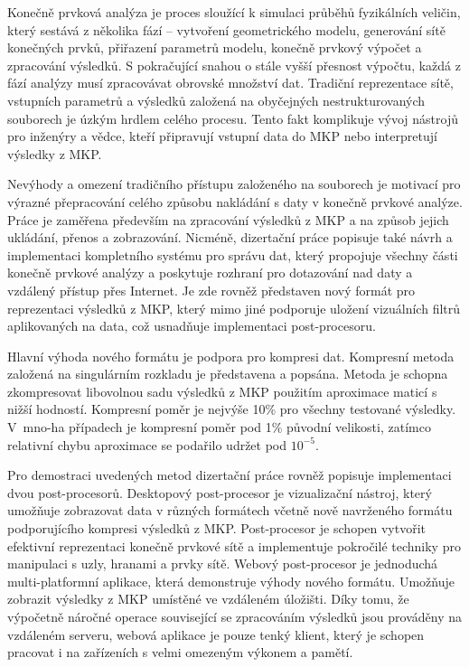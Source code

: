 \noindent
Konečně prvková analýza je proces sloužící k simulaci průběhů fyzikálních veličin, který sestává z několika fází -- vytvoření geometrického modelu, generování sítě konečných prvků, přiřazení parametrů modelu, konečně prvkový výpočet a zpracování výsledků. S pokračující snahou o stále vyšší přesnost výpočtu, každá z fází analýzy musí zpracovávat obrovské množství dat. Tradiční reprezentace sítě, vstupních parametrů a výsledků založená na obyčejných nestrukturovaných souborech je úzkým hrdlem celého procesu. Tento fakt komplikuje vývoj nástrojů pro inženýry a vědce, kteří připravují vstupní data do MKP nebo interpretují výsledky z MKP.

Nevýhody a omezení tradičního přístupu založeného na souborech je motivací pro výrazné přepracování celého způsobu nakládání s daty v konečně prvkové analýze. Práce je zaměřena především na zpracování výsledků z MKP a na způsob jejich ukládání, přenos a zobrazování. Nicméně, dizertační práce popisuje také návrh a implementaci kompletního systému pro správu dat, který propojuje všechny části konečně prvkové analýzy a poskytuje rozhraní pro dotazování nad daty a vzdálený přístup přes Internet. Je zde rovněž představen nový formát pro reprezentaci výsled\-ků z MKP, který mimo jiné podporuje uložení vizuálních filtrů aplikovaných na data, což usnadňuje implementaci post-procesoru.

Hlavní výhoda nového formátu je podpora pro kompresi dat. Kompresní metoda založená na singulárním rozkladu je představena a popsána. Metoda je schopna zkompresovat libovolnou sadu výsledků z MKP použitím aproximace maticí s nižší hodností. Kompresní poměr je nejvýše 10\% pro všechny testované výsledky. V~mno-ha případech je kompresní poměr pod 1\% původní velikosti, zatímco relativní chybu aproximace se podařilo udržet pod $10^{-5}$.

Pro demostraci uvedených metod dizertační práce rovněž popisuje implementaci dvou post-procesorů. Desktopový post-procesor je vizualizační nástroj, který umožňuje zobrazovat data v různých formátech včetně nově navrženého formátu podporujícího kompresi výsledků z MKP. Post-procesor je schopen vytvořit efektivní reprezentaci konečně prvkové sítě a implementuje pokročilé techniky pro manipulaci s uzly, hranami a prvky sítě. Webový post-procesor je jednoduchá multi-platformní aplikace, která demonstruje výhody nového formátu. Umožňuje zobrazit výsledky z MKP umístěné ve vzdáleném úložišti. Díky tomu, že výpočetně náročné operace související se zpracováním výsledků jsou prováděny na vzdáleném serveru, webová aplikace je pouze tenký klient, který je schopen pracovat i na zařízeních s velmi omezeným výkonem a pamětí.\\
